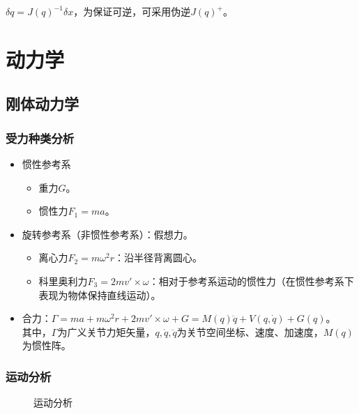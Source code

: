 \documentclass[
12pt, %
a4paper, 
oneside, %
headinclude,footinclude, %
]{scrartcl}
\begin{document}
$ \delta q = J(q)^{-1} \delta x $，为保证可逆，可采用伪逆$ J(q)^+ $。
\section{动力学}
\subsection{刚体动力学}
\subsubsection{受力种类分析}
\begin{itemize}
\item 惯性参考系
\begin{itemize}
\item 重力$ G $。
\item 惯性力$ F_1 = ma $。
\end{itemize} 
\item 旋转参考系（非惯性参考系）：假想力。
\begin{itemize}
\item 离心力$ F_2 = m\omega^2r $：沿半径背离圆心。
\item 科里奥利力$ F_3 = 2mv' \times \omega $：相对于参考系运动的惯性力（在惯性参考系下表现为物体保持直线运动）。
\end{itemize} 
\item 合力：$ \Gamma = ma + m\omega^2r + 2mv' \times \omega + G = M(q)\ddot{q} + V(q, \dot{q}) + G(q) $。 \\
其中，$ \Gamma $为广义关节力矩矢量，$ q,\dot{q},\ddot{q} $为关节空间坐标、速度、加速度，$ M(q) $为惯性阵。
\end{itemize} 
\subsubsection{运动分析}
\begin{figure}[H]
\centering
{} \quad
{} \quad
{} \quad
{}
\caption[运动分析]{运动分析}
\end{figure}
\end{document}
